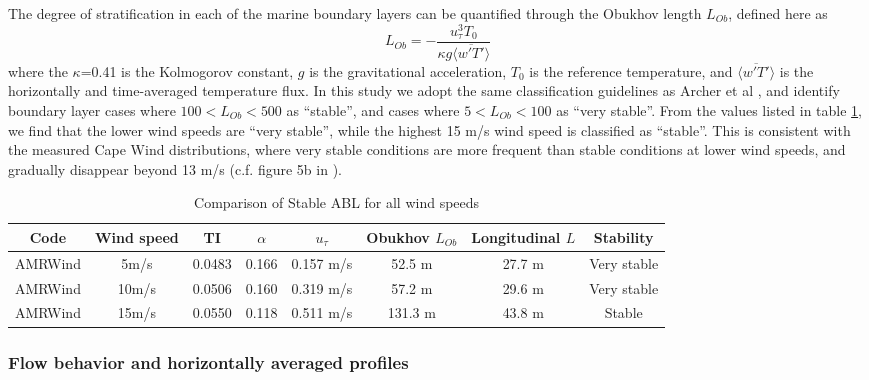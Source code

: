 The degree of stratification in each of the marine boundary layers can
be quantified through the Obukhov length $L_{Ob}$, defined here as
\begin{equation}
  L_{Ob} = -\frac{u_\tau^3 T_0}{\kappa g \langle \overline{w'T'} \rangle}
\end{equation}
where the $\kappa$=0.41 is the Kolmogorov constant, $g$ is the
gravitational acceleration, $T_0$ is the reference temperature, and
$\langle \overline{w'T'} \rangle$ is the horizontally and
time-averaged temperature flux.  In this study we adopt the same
classification guidelines as Archer et al
\cite{archer2016predominance}, and identify boundary layer cases where
$100 < L_{Ob} < 500$ as ``stable'', and cases where $5 < L_{Ob}<100$
as ``very stable''.  From the values listed in table
\ref{tab:CompareAMRallWS}, we find that the lower wind speeds are
``very stable'', while the highest 15 m/s wind speed is classified as
``stable''.  This is consistent with the measured Cape Wind
distributions, where very stable conditions are more frequent than
stable conditions at lower wind speeds, and gradually disappear beyond
13 m/s (c.f. figure 5b in \cite{archer2016predominance}).

\begin{table}
\caption{\label{tab:CompareAMRallWS} Comparison of Stable ABL for all
  wind speeds} \centering
\begin{tabular}{cccccccc}
  \hline
  Code & Wind speed   & TI     & $\alpha$& $u_\tau$ & Obukhov $L_{Ob}$ & Longitudinal $L$ & Stability \\
  \hline
  AMRWind & 5m/s      & 0.0483 &  0.166 &  0.157 m/s  &  52.5 m & 27.7 m  & Very stable\\
  AMRWind & 10m/s     & 0.0506 &  0.160 &  0.319 m/s  &  57.2 m & 29.6 m  & Very stable\\
  AMRWind & 15m/s     & 0.0550 &  0.118 &  0.511 m/s  & 131.3 m & 43.8 m  & Stable \\
  \hline
\end{tabular}
\end{table}

\subsubsection{Flow behavior and horizontally averaged profiles}

